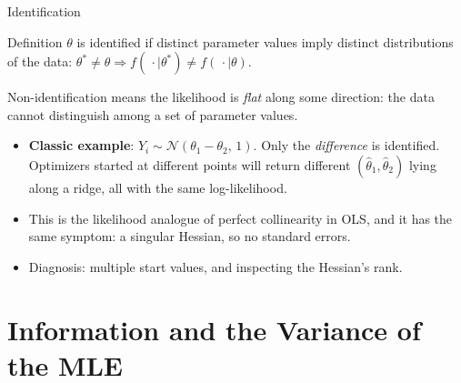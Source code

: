 \documentclass[aspectratio=169,11pt,xcolor=dvipsnames]{beamer}
\begin{document}
\begin{frame}{Identification}
\begin{block}{Definition}
$\theta$ is \alert{identified} if distinct parameter values imply distinct
distributions of the data: $\theta^{*}\neq\theta \Rightarrow
f(\,\cdot \mid \theta^{*}) \neq f(\,\cdot\mid\theta)$.
\end{block}
\vskip4pt
Non-identification means the likelihood is \emph{flat} along some direction: the
data cannot distinguish among a set of parameter values.
\vskip4pt
\begin{itemize}\itemsep2pt
  \item \textbf{Classic example}: $Y_i \sim \mathcal N(\theta_1 - \theta_2,\, 1)$.
        Only the \emph{difference} is identified. Optimizers started at different
        points will return different $(\hat\theta_1,\hat\theta_2)$ lying along a
        ridge, all with the same log-likelihood.
  \item This is the likelihood analogue of \alert{perfect collinearity} in OLS, 
        and it has the same symptom: a singular Hessian, so no standard errors.
  \item Diagnosis: multiple start values, and inspecting the Hessian's rank.
\end{itemize}
\end{frame}

\section[Information]{Information and the Variance of the MLE}
\begin{frame}\sectionpage\end{frame}
\end{document}
